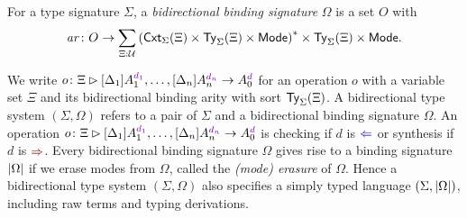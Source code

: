 \begin{definition}
  For a type signature $\Sigma$, a \emph{bidirectional binding signature} $\Omega$ is a set $O$ with
  \[
    \mathit{ar}\colon O \to \sum_{\Xi : \mathcal{U}} \left(\mathsf{Cxt}_{\Sigma}(\Xi) \times \mathsf{Ty}_{\Sigma}(\Xi) \times {\mathsf{Mode}}\right)^* \times \mathsf{Ty}_{\Sigma}(\Xi) \times {\mathsf{Mode}}.
  \]
\end{definition}
We write $\aritysymbol{o}{\Xi}{[\Delta_1]A_{1}^{\dir{d_1}}, \ldots, [\Delta_{n}] A^{\dir{d_n}}_{n}}{A_0^{\dir{d}}}$ for an operation $o$ with a variable set $\Xi$ and its bidirectional binding arity with sort $\mathsf{Ty}_{\Sigma}(\Xi)$.
A bidirectional type system $(\Sigma, \Omega)$ refers to a pair of $\Sigma$ and a bidirectional binding signature $\Omega$.
An operation $\aritysymbol{o}{\Xi}{[\Delta_1]A_{1}^{\dir{d_1}}, \ldots, [\Delta_{n}] A^{\dir{d_n}}_{n}}{A_0^{\dir{d}}}$ is checking if $d$ is ${\chk}$ or synthesis if $d$ is ${\syn}$. 
Every bidirectional binding signature $\Omega$ gives rise to a binding signature $\left|\Omega\right|$ if we erase modes from $\Omega$, called the \emph{(mode) erasure} of $\Omega$.
Hence a bidirectional type system $(\Sigma, \Omega)$ also specifies a simply typed language $(\Sigma, \left|\Omega\right|)$, including raw terms and typing derivations.

